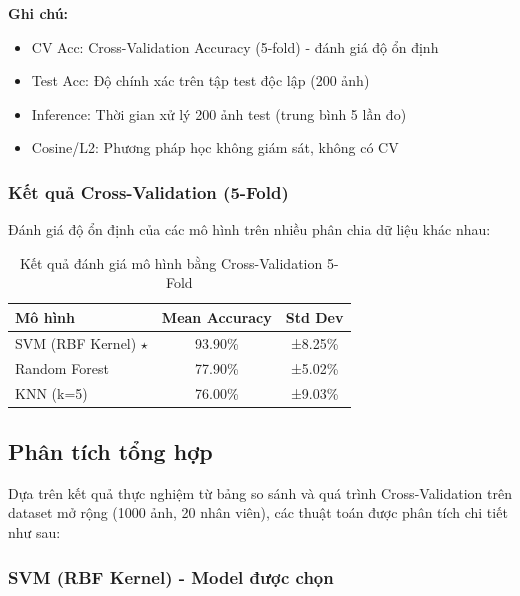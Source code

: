 \documentclass[a4paper]{book}
\begin{document}
\textbf{Ghi chú:} 
\begin{itemize}
    \item CV Acc: Cross-Validation Accuracy (5-fold) - đánh giá độ ổn định
    \item Test Acc: Độ chính xác trên tập test độc lập (200 ảnh)
    \item Inference: Thời gian xử lý 200 ảnh test (trung bình 5 lần đo)
    \item Cosine/L2: Phương pháp học không giám sát, không có CV
\end{itemize}

\subsubsection{Kết quả Cross-Validation (5-Fold)}

Đánh giá độ ổn định của các mô hình trên nhiều phân chia dữ liệu khác nhau:

\begin{table}[h!]
    \centering
    \small
    \begin{tabular}{lcc}
        \hline
        \textbf{Mô hình} & \textbf{Mean Accuracy} & \textbf{Std Dev} \\
        \hline
        SVM (RBF Kernel) \textbf{$\star$} & 93.90\% & ±8.25\% \\
        Random Forest       & 77.90\% & ±5.02\% \\
        KNN (k=5)           & 76.00\% & ±9.03\% \\
        \hline
    \end{tabular}
    \caption{Kết quả đánh giá mô hình bằng Cross-Validation 5-Fold }
    \label{tab:cross-validation}
\end{table}

\subsection{Phân tích tổng hợp}

Dựa trên kết quả thực nghiệm từ bảng so sánh và quá trình Cross-Validation trên dataset mở rộng (1000 ảnh, 20 nhân viên), các thuật toán được phân tích chi tiết như sau:

\subsubsection{SVM (RBF Kernel) - Model được chọn}
\end{document}
